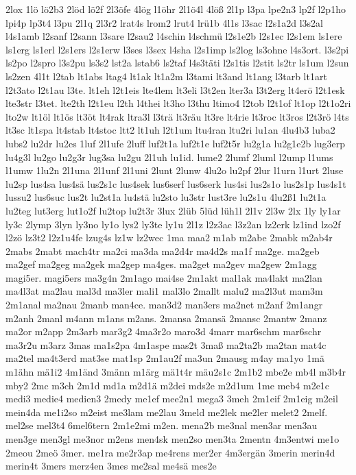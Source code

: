 {2lox
1lö
lö2b3
2löd
lö2f
2l3öfe
4lög
l1öhr
2l1ö4l
4löß
2l1p
l3pa
lpe2n3
lp2f
l2p1ho
lpi4p
lp3t4
l3pu
2l1q
2l3r2
lrat4s
lrom2
lrut4
lrü1b
4l1s
l3sac
l2s1a2d
l3s2al
l4s1amb
l2sanf
l2sann
l3sare
l2sau2
l4schin
l4schmü
l2s1e2b
l2s1ec
l2s1em
ls1ere
ls1erg
ls1erl
l2s1ers
l2s1erw
l3ses
l3sex
l4sha
l2s1imp
ls2log
ls3ohne
l4s3ort.
l3s2pi
ls2po
l2spro
l3s2pu
ls3s2
lst2a
lstab6
ls2taf
l4s3täti
l2s1tis
l2stit
ls2tr
ls1um
l2sun
ls2zen
4l1t
l2tab
lt1abs
ltag4
lt1ak
lt1a2m
l3tami
lt3and
lt1ang
l3tarb
lt1art
l2t3ato
l2t1au
l3te.
lt1eh
l2t1eis
lte4lem
lt3eli
l3t2en
lter3a
l3t2erg
lt4erö
l2t1esk
lte3str
l3tet.
lte2th
l2t1eu
l2th
l4thei
lt3ho
l3thu
ltimo4
l2tob
l2t1of
lt1op
l2t1o2ri
lto2w
lt1öl
lt1ös
lt3öt
lt4rak
ltra3l
l3trä
lt3räu
lt3re
lt4rie
lt3roc
lt3ros
l2t3rö
l4ts
lt3sc
lt1spa
lt4stab
lt4stoc
ltt2
lt1uh
l2t1um
ltu4ran
ltu2ri
lu1an
4lu4b3
luba2
lubs2
lu2dr
lu2es
1luf
2l1ufe
2luff
luf2t1a
luf2t1e
luf2t5r
lu2g1a
lu2g1e2b
lug3erp
lu4g3l
lu2go
lu2g3r
lug3sa
lu2gu
2l1uh
lu1id.
lume2
2lumf
2luml
l2ump
l1ums
l1umw
1lu2n
2l1una
2l1unf
2l1uni
2lunt
2lunw
4lu2o
lu2pf
2lur
l1urn
l1urt
2luse
lu2sp
lus4sa
lus4sä
lus2s1c
lus4sek
lus6serf
lus6serk
lus4si
lus2s1o
lus2s1p
lus4s1t
lussu2
lus6suc
lus2t
lu2st1a
lu4stä
lu2sto
lu3str
lust3re
lu2s1u
4lu2ß1
lu2t1a
lu2teg
lut3erg
lut1o2f
lu2top
lu2t3r
3lux
2lüb
5lüd
lüh1l
2l1v
2l3w
2lx
1ly
ly1ar
ly3c
2lymp
3lyn
ly3no
ly1o
lys2
ly3te
ly1u
2l1z
l2z3ac
l3z2an
lz2erk
lz1ind
lzo2f
l2zö
lz3t2
l2z1u4fe
lzug4s
lz1w
lz2wec
1ma
maa2
m1ab
m2abe
2mabk
m2ab4r
2mabs
2mabt
mach4tr
ma2ci
ma3da
ma2d4r
ma4d2s
ma1f
ma2ge.
ma2geb
ma2gef
ma2geg
ma2gek
ma2gep
ma4ges.
ma2get
ma2gev
ma2gew
2m1agg
magi5er.
magi5ers
ma3g4n
2m1ago
mai4se
2m1akt
mal1ak
ma4lakt
ma2lan
ma4l3at
ma2lau
mal3d
ma3ler
mali1
mal3lo
2mallt
malu2
ma2l3ut
mam3m
2m1anal
ma2nau
2manb
man4ce.
man3d2
man3ers
ma2net
m2anf
2m1angr
m2anh
2manl
m4ann
m1ans
m2ans.
2mansa
2mansä
2mansc
2mantw
2manz
ma2or
m2app
2m3arb
mar3g2
4ma3r2o
maro3d
4marr
mar6schm
mar6schr
ma3r2u
m3arz
3mas
ma1s2pa
4m1aspe
mas2t
3maß
ma2ta2b
ma2tan
mat4c
ma2tel
ma4t3erd
mat3se
mat1sp
2m1au2f
ma3un
2mausg
m4ay
ma1yo
1mä
m1ähn
mä1i2
4m1änd
3männ
m1ärg
mä1t4r
mäu2s1c
2m1b2
mbe2e
mb4l
m3b4r
mby2
2mc
m3ch
2m1d
md1a
m2d1ä
m2dei
mds2e
m2d1um
1me
meb4
m2e1c
medi3
medie4
medien3
2medy
me1ef
mee2n1
mega3
3meh
2m1eif
2m1eig
m2eil
mein4da
me1i2so
m2eist
me3lam
me2lau
3meld
me2lek
me2ler
melet2
2melf.
mel2se
mel3t4
6mel6tern
2m1e2mi
m2en.
mena2b
me3nal
men3ar
men3au
men3ge
men3gl
me3nor
m2ens
men4sk
men2so
men3ta
2mentn
4m3entwi
me1o
2meou
2meö
3mer.
me1ra
me2r3ap
me4rens
mer2er
4m3ergän
3merin
merin4d
merin4t
3mers
merz4en
3mes
me2sal
me4sä
mes2e
}
